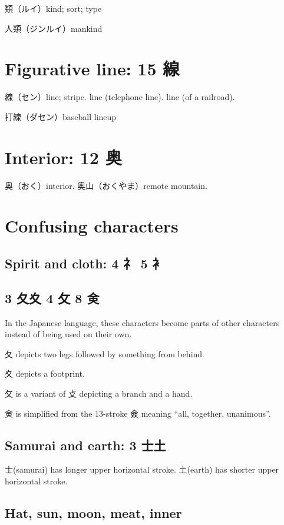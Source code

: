 類（ルイ）kind; sort; type

人類（ジンルイ）mankind

\section{Figurative line: 15 線}

線（セン）line; stripe.
line (telephone line).
line (of a railroad).

打線（ダセン）baseball lineup

\section{Interior: 12 奥}

奥（おく）interior.
奥山（おくやま）remote mountain.

\section{Confusing characters}

\subsection{Spirit and cloth: 4 礻 5 衤}

\subsection{3 夂夊 4 攵 8 㑒}

In the Japanese language,
these characters become parts of other characters
instead of being used on their own.

夂 depicts two legs followed by something from behind.

夊 depicts a footprint.

攵 is a variant of 攴 depicting a branch and a hand.

㑒 is simplified from the 13-stroke 僉
meaning ``all, together, unanimous''.

\subsection{Samurai and earth: 3 士土}

士(samurai) has longer upper horizontal stroke.
土(earth) has shorter upper horizontal stroke.

\subsection{Hat, sun, moon, meat, inner}

